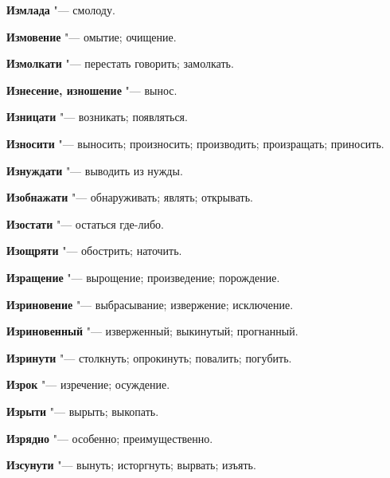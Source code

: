 \begin{mymulticols}{2}
\noindent\textbf{Измлада} "--- смолоду. 




\noindent\textbf{Измовение} "--- омытие; очищение. 




\noindent\textbf{Измолкати} "--- перестать говорить; замолкать. 




\noindent\textbf{Изнесение, изношение} "--- вынос. 




\noindent\textbf{Изницати} "--- возникать; появляться. 




\noindent\textbf{Износити} "--- выносить; произносить; производить; произращать; приносить. 




\noindent\textbf{Изнуждати} "--- выводить из нужды. 




\noindent\textbf{Изобнажати} "--- обнаруживать; являть; открывать. 




\noindent\textbf{Изостати} "--- остаться где-либо. 




\noindent\textbf{Изощряти} "--- обострить; наточить. 




\noindent\textbf{Изращение} "--- вырощение; произведение; порождение. 




\noindent\textbf{Изриновение} "--- выбрасывание; извержение; исключение. 




\noindent\textbf{Изриновенный} "--- изверженный; выкинутый; прогнанный. 




\noindent\textbf{Изринути} "--- столкнуть; опрокинуть; повалить; погубить. 




\noindent\textbf{Изрок} "--- изречение; осуждение. 




\noindent\textbf{Изрыти} "--- вырыть; выкопать. 




\noindent\textbf{Изрядно} "--- особенно; преимущественно. 




\noindent\textbf{Изсунути} "--- вынуть; исторгнуть; вырвать; изъять. 





\end{mymulticols}
